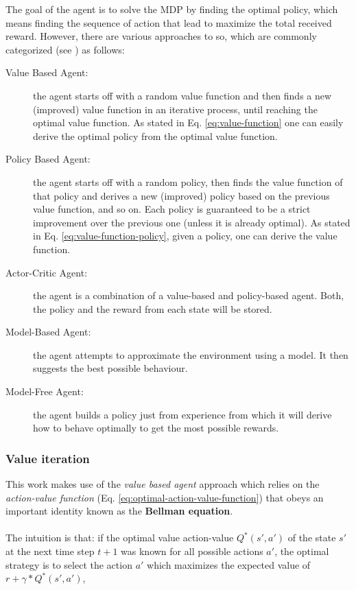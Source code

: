 The goal of the agent is to solve the MDP by finding the optimal policy, which means finding the sequence of action that lead to maximize the total received reward.
However, there are various approaches to so, which are commonly categorized (see \cite{rl-demysitifed2}) as follows:
\begin{description}
    \item[Value Based Agent:] the agent starts off with a random value function and then finds a new (improved) value function in an iterative process, until reaching the optimal value function. 
    As stated in Eq. \ref{eq:value-function} one can easily derive the optimal policy from the optimal value function. 

    \item[Policy Based Agent:] the agent starts off with a random policy, then finds the value function of that policy and derives a new (improved) policy based on the previous value function, and so on. Each policy is guaranteed to be a strict improvement over the previous one (unless it is already optimal). As stated in Eq. \ref{eq:value-function-policy}, given a policy, one can derive the value function.

    \item[Actor-Critic Agent:] the agent is a combination of a value-based and policy-based agent. Both, the policy and the reward from each state will be stored.

    \item[Model-Based Agent:] the agent attempts to approximate the environment using a model. It then suggests the best possible behaviour.

    \item[Model-Free Agent:] the agent builds a policy just from experience from which it will derive how to behave optimally to get the most possible rewards.
\end{description}

\subsubsection{Value iteration}

This work makes use of the \textit{value based agent} approach which relies on the \textit{action-value function} (Eq. \ref{eq:optimal-action-value-function}) that obeys an important identity known as the \textbf{Bellman equation}. 
\\
\\
The intuition is that: if the optimal value action-value $Q^*(s',a')$ of the state $s'$ at the next time step $t+1$ was known for all possible actions $a'$, the optimal strategy is to select the action $a'$ which maximizes the expected value of $r+\gamma*Q^*(s',a')$,

